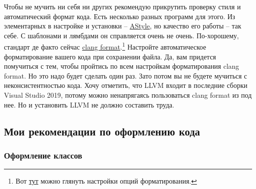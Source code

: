 \documentclass{article}
\begin{document}
Чтобы не мучить ни себя ни других рекомендую прикрутить проверку стиля и автоматический формат кода. Есть несколько разных программ для этого. Из элементарных в настройке и установки -- \href{http://astyle.sourceforge.net/}{AStyle}, но качество его работы -- так себе. С шаблонами и лямбдами он справляется очень не очень. По-хорошему, стандарт де факто сейчас \href{https://clang.llvm.org/docs/ClangFormat.html}{clang format}.\footnote{Вот \href{https://clang.llvm.org/docs/ClangFormatStyleOptions.html}{тут} можно глянуть настройки опций форматирования.} Настройте автоматическое форматирование вашего кода при сохранении файла. Да, вам придется помучиться с тем, чтобы пройтись по всем настройкам форматирования clang format. Но это надо будет сделать один раз. Зато потом вы не будете мучиться с неконсистентностью кода. Хочу отметить, что LLVM входит в последние сборки Visual Studio 2019, потому можно ненапрягаясь пользоваться clang format из под нее. Но и установить LLVM не должно составить труда.

\subsection{Мои рекомендации по оформлению кода}

\subsubsection{Оформление классов}
\end{document}

